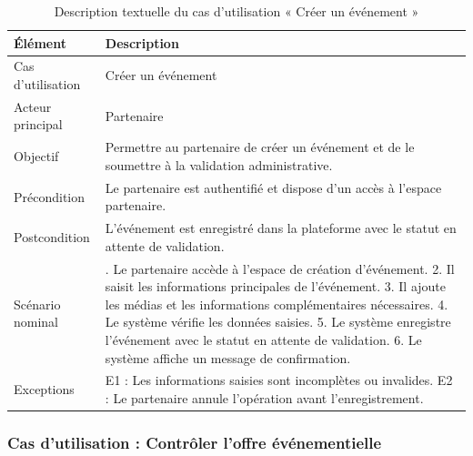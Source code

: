 \begin{table}[H]
\centering
\caption{Description textuelle du cas d’utilisation « Créer un événement »}
\label{tableau:4-5}
\renewcommand{\arraystretch}{1.2}
\begin{tabularx}{\textwidth}{|>{\raggedright\arraybackslash}X|>{\raggedright\arraybackslash}X|}
\hline
\rowcolor[HTML]{ECF4FF}
\textbf{Élément} & \textbf{Description} \\
\hline
Cas d’utilisation & Créer un événement \\
\hline
Acteur principal & Partenaire \\
\hline
Objectif & Permettre au partenaire de créer un événement et de le soumettre à la validation administrative. \\
\hline
Précondition & Le partenaire est authentifié et dispose d’un accès à l’espace partenaire. \\
\hline
Postcondition & L’événement est enregistré dans la plateforme avec le statut en attente de validation. \\
\hline
Scénario nominal & 1. Le partenaire accède à l’espace de création d’événement.\newline{} 2. Il saisit les informations principales de l’événement.\newline{} 3. Il ajoute les médias et les informations complémentaires nécessaires.\newline{} 4. Le système vérifie les données saisies.\newline{} 5. Le système enregistre l’événement avec le statut en attente de validation.\newline{} 6. Le système affiche un message de confirmation. \\
\hline
Exceptions & E1 : Les informations saisies sont incomplètes ou invalides.\newline{} E2 : Le partenaire annule l’opération avant l’enregistrement. \\
\hline
\end{tabularx}
\end{table}


\subsubsection{Cas d’utilisation : Contrôler l’offre événementielle}


